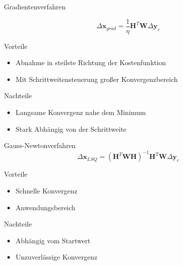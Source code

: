 \documentclass[8pt, t, aspectratio=169,%
]{beamer}
\begin{document}
\begin{frame}{Gradientenverfahren}\LARGE

\begin{equation}
	\Delta\textbf{x}_{grad} = \frac{1}{\eta}\textbf{H}^T\textbf{W}\Delta\textbf{y}_c
\end{equation}

\begin{minipage}{0.5\linewidth}
Vorteile
\begin{itemize}
	\item Abnahme in steilste Richtung der Kostenfunktion
	\item Mit Schrittweitensteuerung großer Konvergenzbereich
\end{itemize}
\end{minipage}%
\begin{minipage}{0.5\linewidth}
Nachteile
\begin{itemize}
	\item Langsame Konvergenz nahe dem Minimum
	\item Stark Abhängig von der Schrittweite
\end{itemize}
\end{minipage}
\end{frame}



\begin{frame}{Gauss-Newtonverfahren}\LARGE
\begin{equation}
	\Delta \textbf{x}_{LSQ} = (\textbf{H}^T \textbf{W} \textbf{H})^{-1} \textbf{H}^T \textbf{W} \Delta \textbf{y}_c
\end{equation}

\begin{minipage}{0.5\linewidth}
Vorteile
\begin{itemize}
	\item Schnelle Konvergenz
	\item Anwendungsbereich
\end{itemize}
\end{minipage}%
\begin{minipage}{0.5\linewidth}
Nachteile
\begin{itemize}
	\item Abhängig vom Startwert
	\item Unzuverlässige Konvergenz
\end{itemize}
\end{minipage}

\end{frame}
\end{document}
